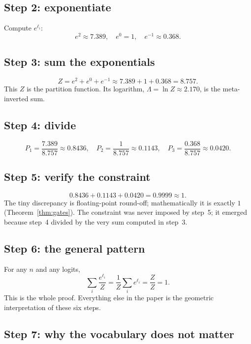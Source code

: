 \documentclass[11pt]{article}
\begin{document}
\subsection{Step 2: exponentiate}
\label{sec:tut-2}

Compute $e^{\ell_i}$:
\[
e^2 \approx 7.389,\quad e^0 = 1,\quad e^{-1}\approx 0.368.
\]

\subsection{Step 3: sum the exponentials}
\label{sec:tut-3}

\[
Z = e^2 + e^0 + e^{-1} \approx 7.389 + 1 + 0.368 = 8.757.
\]
This $Z$ is the partition function. Its logarithm,
$\Lambda = \ln Z \approx 2.170$, is the meta-inverted sum.

\subsection{Step 4: divide}
\label{sec:tut-4}

\[
P_1 = \frac{7.389}{8.757}\approx 0.8436,\quad
P_2 = \frac{1}{8.757}\approx 0.1143,\quad
P_3 = \frac{0.368}{8.757}\approx 0.0420.
\]

\subsection{Step 5: verify the constraint}
\label{sec:tut-5}

\[
0.8436 + 0.1143 + 0.0420 = 0.9999 \approx 1.
\]
The tiny discrepancy is floating-point round-off; mathematically it is exactly
$1$ (Theorem~\ref{thm:gates}). The constraint was never imposed by step~5; it
emerged because step~4 divided by the very sum computed in step~3.

\subsection{Step 6: the general pattern}
\label{sec:tut-6}

For any $n$ and any logits,
\[
\sum_i \frac{e^{\ell_i}}{Z}
= \frac{1}{Z}\sum_i e^{\ell_i}
= \frac{Z}{Z}=1.
\]
This is the whole proof. Everything else in the paper is the geometric
interpretation of these six steps.

\subsection{Step 7: why the vocabulary does not matter}
\label{sec:tut-7}
\end{document}
